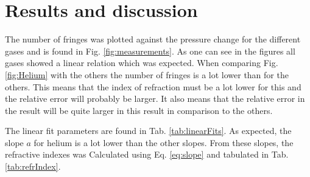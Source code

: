 \section{Results and discussion}
The number of fringes was plotted against the pressure change for the different gases and is found in Fig. \ref{fig:measurements}. As one can see in the figures all gases showed a linear relation which was expected. When comparing Fig. \ref{fig:Helium} with the others the number of fringes is a lot lower than for the others. This means that the index of refraction must be a lot lower for this and the relative error will probably be larger. It also means that the relative error in the result will be quite larger in this result in comparison to the others.

The linear fit parameters are found in Tab. \ref{tab:linearFits}. As expected, the slope $a$ for helium is a lot lower than the other slopes. From these slopes, the refractive indexes was Calculated using Eq. \eqref{eq:slope} and tabulated in Tab. \ref{tab:refrIndex}.

